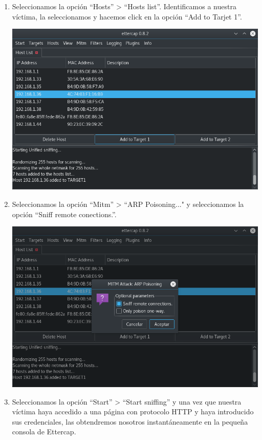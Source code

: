 \begin{enumerate}
\begin{center}
	\end{center}
	\newpage
	\item Seleccionamos la opción ``Hosts'' > ``Hosts list''. Identificamos a nuestra víctima, la seleccionamos y hacemos click en la opción ``Add to Tarjet 1''.
	\begin{center}
		\includegraphics[scale=0.5]{e3.png}
	\end{center}
	\item Seleccionamos la opción ``Mitm'' > ``ARP Poisoning..." y seleccionamos la opción ``Sniff remote conections.''.
	\begin{center}
		\includegraphics[scale=0.5]{e4.png}
	\end{center}
	\newpage
	\item Seleccionamos la opción ``Start'' > ``Start sniffing'' y una vez que nuestra víctima haya accedido a una página con protocolo HTTP y haya introducido sus credenciales, las obtendremos nosotros instantáneamente en la pequeña consola de Ettercap.

\end{enumerate}
